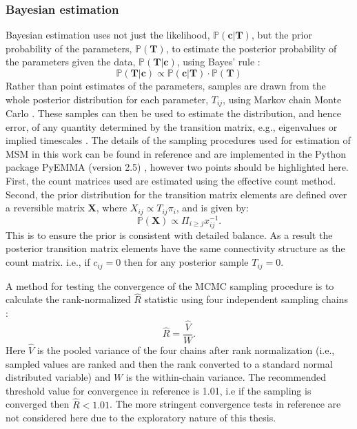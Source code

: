 \subsubsection{Bayesian estimation}\label{sec:theory_bayes}
Bayesian estimation uses not just the likelihood, $\mathbb{P}(\mathbf{c}|\mathbf{T})$, but the prior probability of the parameters, $\mathbb{P}(\mathbf{T})$, to estimate the posterior probability of the parameters given the data, $\mathbb{P}(\mathbf{T}|\mathbf{c})$, using Bayes' rule \cite{gelmanBayesianDataAnalysis2014}: 
\begin{equation}
    \mathbb{P}(\mathbf{T}|\mathbf{c}) \propto \mathbb{P}(\mathbf{c}|\mathbf{T})\cdot\mathbb{P}(\mathbf{T})
\end{equation}
Rather than point estimates of the parameters, samples are drawn from the whole posterior distribution for each parameter, $T_{ij}$, using Markov chain Monte Carlo \cite{gelmanBayesianDataAnalysis2014}. These samples can then be used to estimate the distribution, and hence error, of any quantity determined by the transition matrix, e.g., eigenvalues or implied timescales \cite{gelmanBayesianDataAnalysis2014}. The details of the sampling procedures used for estimation of MSM in this work can be found in reference \cite{trendelkamp-schroerEstimationUncertaintyReversible2015b} and are implemented in the Python package PyEMMA (version 2.5) \cite{schererPyEMMASoftwarePackage2015a}, however two points should be highlighted here. First, the count matrices used are estimated using the effective count method. Second, the prior distribution for the transition matrix elements are defined over a reversible matrix $\mathbf{X}$, where $X_{ij}\propto T_{ij}\pi_{i}$, and is given by: 
\begin{equation}\label{eqn:theory_rev_prior}
    \mathbb{P}(\mathbf{X}) \propto \Pi_{i \ge j}x_{ij}^{-1}. 
\end{equation}
This is to ensure the prior is consistent with detailed balance. As a result the posterior transition matrix elements have the same connectivity structure as the count matrix. i.e., if $c_{ij}=0$ then for any posterior sample $T_{ij}=0$. 

A method for testing the convergence of the MCMC sampling procedure is to calculate the rank-normalized $\hat{R}$ statistic using four independent sampling chains \cite{vehtariRanknormalizationFoldingLocalization2020}:
\begin{equation}
    \hat{R} = \frac{\hat{V}}{W}.
\end{equation}
Here $\hat{V}$ is the pooled variance of the four chains after rank normalization (i.e., sampled values are ranked and then the rank converted to a standard normal distributed variable) and $W$ is the within-chain variance. The recommended threshold value for convergence in reference \cite{vehtariRanknormalizationFoldingLocalization2020} is \num{1.01}, i.e if the sampling is converged then $\widehat{R} < 1.01$. The more stringent convergence tests in reference \cite{vehtariRanknormalizationFoldingLocalization2020} are not considered here due to the exploratory nature of this thesis.   

